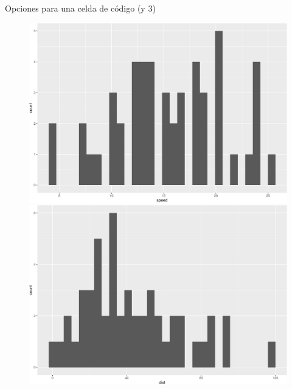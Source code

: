 \documentclass[
  10pt,
  ignorenonframetext,
]{beamer}
\begin{document}
\begin{frame}[fragile]{Opciones para una celda de código (y 3)}
\begin{figure}
\begin{minipage}{0.50\linewidth}
\includegraphics{Tema06_files/figure-beamer/unnamed-chunk-2-1.pdf}\end{minipage}%
%
\begin{minipage}{0.50\linewidth}
\includegraphics{Tema06_files/figure-beamer/unnamed-chunk-2-2.pdf}\end{minipage}%

\end{figure}%
\end{frame}
\end{document}
